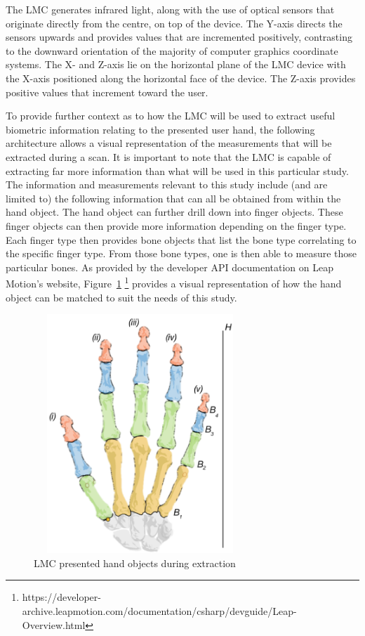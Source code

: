 The LMC generates infrared light, along with the use of optical sensors that originate directly from the centre, on top of the device. The Y-axis directs the sensors upwards and provides values that are incremented positively, contrasting to the downward orientation of the majority of computer graphics coordinate systems. The X- and Z-axis lie on the horizontal plane of the LMC device with the X-axis positioned along the horizontal face of the device. The Z-axis provides positive values that increment toward the user. 

To provide further context as to how the LMC will be used to extract useful biometric information relating to the presented user hand, the following architecture allows a visual representation of the measurements that will be extracted during a scan. It is important to note that the LMC is capable of extracting far more information than what will be used in this particular study. The information and measurements relevant to this study include (and are limited to) the following information that can all be obtained from within the hand object. The hand object can further drill down into finger objects. These finger objects can then provide more information depending on the finger type. Each finger type then provides bone objects that list the bone type correlating to the specific finger type. From those bone types, one is then able to measure those particular bones.  As provided by the developer API documentation on Leap Motion’s website, Figure~\ref{fig:LMC presented hand objects during extraction} \footnote{https://developer-archive.leapmotion.com/documentation/csharp/devguide/Leap-Overview.html} provides a visual representation of how the hand object can be matched to suit the needs of this study.

    
    \begin{figure}[htbp!] 
    \centering    
    \includegraphics[width=8cm,height=9cm,keepaspectratio]{Chapter3/Figs/LMC_presented_hand_objects_during_extraction.png}
    \caption[LMC-presented hand objects during extraction]{LMC presented hand objects during extraction}
    \label{fig:LMC presented hand objects during extraction}
    \end{figure}

